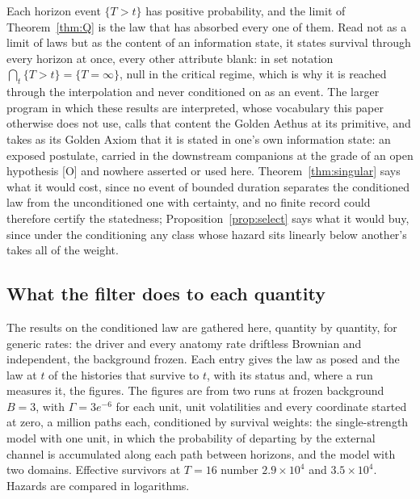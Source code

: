 \begin{remark}
\label{rem:qcontent}
Each horizon event $\{T>t\}$ has positive probability, and the limit of
Theorem~\ref{thm:Q} is the law that has absorbed every one of them. Read
not as a limit of laws but as the content of an information state, it
states survival through every horizon at once, every other attribute
blank: in set notation $\bigcap_t\{T>t\}=\{T=\infty\}$, null in the
critical regime, which is why it is reached through the interpolation
and never conditioned on as an event. The larger program in which these
results are interpreted, whose vocabulary this paper otherwise does not
use, calls that content the Golden Aethus at its primitive, and takes
as its Golden Axiom that it is stated in one's own information state:
an exposed postulate, carried in the downstream companions at the grade
of an open hypothesis {[O]} and nowhere asserted or used here.
Theorem~\ref{thm:singular} says what it would cost, since no event of
bounded duration separates the conditioned law from the unconditioned
one with certainty, and no finite record could therefore certify the
statedness; Proposition~\ref{prop:select} says what it would buy, since
under the conditioning any class whose hazard sits linearly below
another's takes all of the weight.
\end{remark}


\subsection{What the filter does to each quantity}\label{sec:exhibit}

The results on the conditioned law are gathered here, quantity by
quantity, for generic rates: the driver and every anatomy rate driftless
Brownian and independent, the background frozen. Each entry gives the law
as posed and the law at $t$ of the histories that survive to $t$, with its status and, where a
run measures it, the figures.
The figures are from two runs at frozen background $B=3$, with
$\Gamma=3e^{-6}$ for each unit, unit volatilities and every coordinate
started at zero, a million paths each, conditioned by survival weights:
the single-strength model with one unit, in which the probability of
departing by the external channel is accumulated along each path between
horizons, and the model with two domains. Effective survivors at $T=16$
number $2.9\times10^{4}$ and $3.5\times10^{4}$. Hazards are compared in logarithms.

